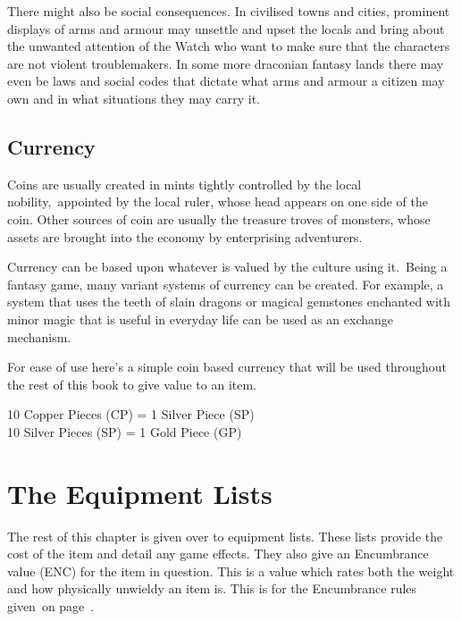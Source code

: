 There might also be social consequences. In civilised towns and cities, prominent displays of arms and armour may unsettle and upset the locals and bring about the unwanted attention of the Watch who want to make sure that the characters are not violent troublemakers. In some more draconian fantasy lands there may even be laws and social codes that dictate what arms and armour a citizen may own and in what situations they may carry it. 

\subsection{Currency}
Coins are usually created in mints tightly controlled by the local nobility, appointed by the local ruler, whose head appears on one side of the coin. Other sources of coin are usually the treasure troves of monsters, whose assets are brought into the economy by enterprising adventurers.

Currency can be based upon whatever is valued by the culture using it. Being a fantasy game, many variant systems of currency can be created. For example, a system that uses the teeth of slain dragons or magical gemstones enchanted with minor magic that is useful in everyday life can be used as an exchange mechanism.

For ease of use here’s a simple coin based currency that will be used throughout the rest of this book to give value to an item.

\begin{rpg-table}[|X|]
	\hline
	10 Copper Pieces (CP) = 1 Silver Piece (SP)\\
	10 Silver Pieces (SP) = 1 Gold Piece (GP)\\
	\hline
\end{rpg-table}

\section{The Equipment Lists}
The rest of this chapter is given over to equipment lists. These lists provide the cost of the item and detail any game effects. They also give an Encumbrance value (ENC) for the item in question. This is a value which rates both the weight and how physically unwieldy an item is. This is for the Encumbrance rules given on page~\pageref{ssec:encumbrance}.

